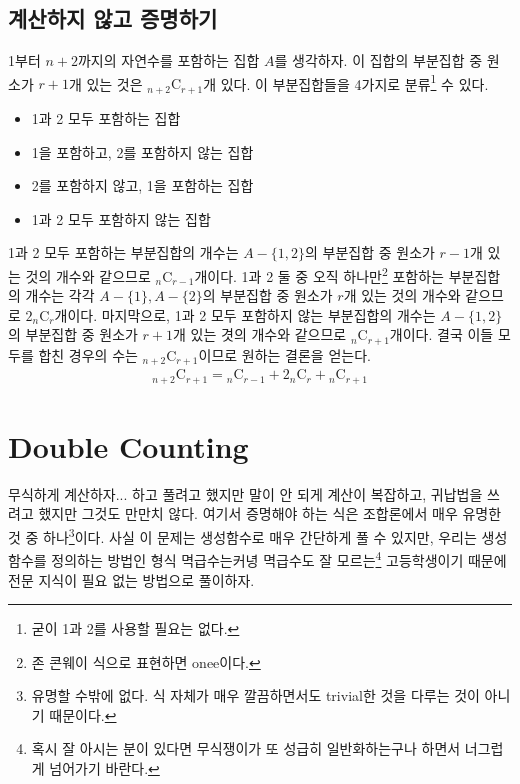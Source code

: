 \documentclass{scrartcl}
\newcommand{\combi}[2]{{}_{#1}\mathrm{C}_{#2}}
\begin{document}
\subsection{계산하지 않고 증명하기}
1부터 \(n+2\)까지의 자연수를 포함하는 집합 \(A\)를 생각하자. 이 집합의 부분집합 중 원소가 \(r+1\)개 있는 것은 \(\combi{n+2}{r+1}\)개 있다. 이 부분집합들을 4가지로 분류\footnote{굳이 1과 2를 사용할 필요는 없다.} 수 있다.
\begin{itemize}
  \item 1과 2 모두 포함하는 집합
  \item 1을 포함하고, 2를 포함하지 않는 집합
  \item 2를 포함하지 않고, 1을 포함하는 집합
  \item 1과 2 모두 포함하지 않는 집합
\end{itemize}
1과 2 모두 포함하는 부분집합의 개수는 \(A-\{1, 2\}\)의 부분집합 중 원소가 \(r-1\)개 있는 것의 개수와 같으므로 \(\combi{n}{r-1}\)개이다. 1과 2 둘 중 오직 하나만\footnote{존 콘웨이 식으로 표현하면 onee이다.} 포함하는 부분집합의 개수는 각각 \(A-\{1\}, A-\{2\}\)의 부분집합 중 원소가 \(r\)개 있는 것의 개수와 같으므로 \(2\combi{n}{r}\)개이다. 마지막으로, 1과 2 모두 포함하지 않는 부분집합의 개수는 \(A-\{1, 2\}\)의 부분집합 중 원소가 \(r+1\)개 있는 겻의 개수와 같으므로 \(\combi{n}{r+1}\)개이다. 결국 이들 모두를 합친 경우의 수는 \(\combi{n+2}{r+1}\)이므로 원하는 결론을 얻는다.
\begin{align*}
  \combi{n+2}{r+1}=\combi{n}{r-1}+2\combi{n}{r}+\combi{n}{r+1}
\end{align*}

\section{Double Counting}
무식하게 계산하자... 하고 풀려고 했지만 말이 안 되게 계산이 복잡하고, 귀납법을 쓰려고 했지만 그것도 만만치 않다. 여기서 증명해야 하는 식은 조합론에서 매우 유명한 것 중 하나\footnote{유명할 수밖에 없다. 식 자체가 매우 깔끔하면서도 trivial한 것을 다루는 것이 아니기 때문이다.}이다. 사실 이 문제는 생성함수로 매우 간단하게 풀 수 있지만, 우리는 생성함수를 정의하는 방법인 형식 멱급수는커녕 멱급수도 잘 모르는\footnote{혹시 잘 아시는 분이 있다면 무식쟁이가 또 성급히 일반화하는구나 하면서 너그럽게 넘어가기 바란다.} 고등학생이기 때문에 전문 지식이 필요 없는 방법으로 풀이하자.
\end{document}
